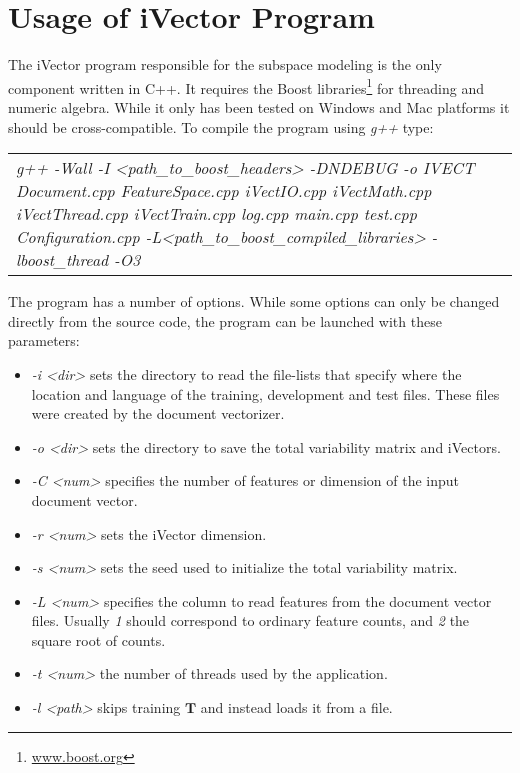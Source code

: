 \section{Usage of iVector Program}

The iVector program responsible for the subspace modeling is the only component written in C++. It requires the Boost libraries\footnote{\url{www.boost.org}} for threading and numeric algebra. While it only has been tested on Windows and Mac platforms it should be cross-compatible. To compile the program using \emph{g++} type: 
\begin{table*}[!h]
\begin{center}
\begin{tabular}{p{}}
	\emph{g++ -Wall -I <path\_to\_boost\_headers>  -DNDEBUG -o IVECT Document.cpp FeatureSpace.cpp iVectIO.cpp iVectMath.cpp iVectThread.cpp iVectTrain.cpp log.cpp main.cpp test.cpp Configuration.cpp -L<path\_to\_boost\_compiled\_libraries> -lboost\_thread -O3} 
\end{tabular}
\end{center}
\end{table*}

The program has a number of options. While some options can only be changed directly from the source code, the program can be launched with these parameters:
\begin{itemize}
	\item \emph{-i <dir>} sets the directory to read the file-lists that specify where the location and language of the training, development and test files. These files were created by the document vectorizer.
	\item \emph{-o <dir>} sets the directory to save the total variability matrix and iVectors.
	\item \emph{-C <num>} specifies the number of features or dimension of the input document vector.
	\item \emph{-r <num>} sets the iVector dimension.
	\item \emph{-s <num>} sets the seed used to initialize the total variability matrix.
	\item \emph{-L <num>} specifies the column to read features from the document vector files. Usually \emph{1} should correspond to ordinary feature counts, and \emph{2} the square root of counts.
	\item \emph{-t <num>} the number of threads used by the application.
	\item \emph{-l <path>} skips training $\mathbf{T}$ and instead loads it from a file.
\end{itemize}



